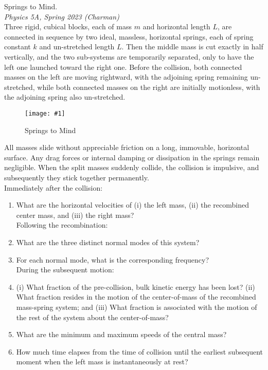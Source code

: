 \documentclass[11pt]{article}
\newcommand{\fig}[4]{
    \begin{figure}[H]
        \centering
        \texttt{[image: \#1]}
        \caption{#2}
        \label{exp4fit}
    \end{figure}
}
\theoremstyle{gangnamstyle}{\newtheorem{definition}{Definition}[]}
\theoremstyle{gangnamstyle}{\newtheorem{example}{Example}[]}
\theoremstyle{gangnamstyle}{\newtheorem{problem}{Problem}[]}
\theoremstyle{gangnamstyle}{\newtheorem{warning}{Warning}[]}
\begin{document}
\begin{problem}
Springs to Mind. \\
\textit{Physics 5A, Spring 2023 (Charman)} \\
Three rigid, cubical blocks, each of mass $m$ and horizontal length $L$, are connected in sequence by two ideal, massless, horizontal springs, each of spring constant $k$ and un-stretched length $L$. Then the middle mass is cut exactly in half vertically, and the two sub-systems are temporarily separated, only to have the left one launched toward the right one. Before the collision, both connected masses on the left are moving rightward, with the adjoining spring remaining un-stretched, while both connected masses on the right are initially motionless, with the adjoining spring also un-stretched.
\fig{figs/n3/charman.jpg}{Springs to Mind}{0.5}{0}
All masses slide without appreciable friction on a long, immovable, horizontal surface. Any drag forces or internal damping or dissipation in the springs remain negligible. When the split masses suddenly collide, the collision is impulsive, and subsequently they stick together permanently. \\

\hspace{0.8cm} Immediately after the collision:
\begin{enumerate}
\item What are the horizontal velocities of (i) the left mass, (ii) the recombined center
mass, and (iii) the right mass? \\

Following the recombination:
\item What are the three distinct normal modes of this system? 
\item For each normal mode, what is the corresponding frequency? \\

During the subsequent motion:
\item (i) What fraction of the pre-collision, bulk kinetic energy has been lost? (ii) What fraction resides in the motion of the center-of-mass of the recombined mass-spring system; and (iii) What fraction is associated with the motion of the rest of the system about the center-of-mass?
\item What are the minimum and maximum speeds of the central mass?
\item How much time elapses from the time of collision until the earliest subsequent moment when the left mass is instantaneously at rest?
\end{enumerate}
\end{problem}
\end{document}
